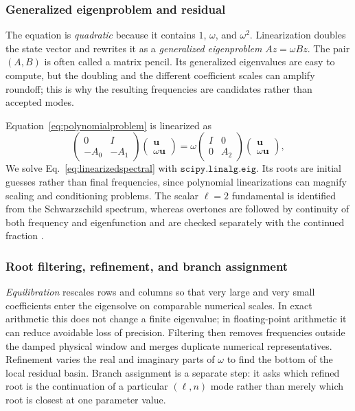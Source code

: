 \documentclass[12pt,a4paper]{article}
\begin{document}
\subsubsection{Generalized eigenproblem and residual}

The equation is \emph{quadratic} because it contains \(1\), \(\omega\), and
\(\omega^2\).  Linearization doubles the state vector and rewrites it as a
\emph{generalized eigenproblem} \(Az=\omega Bz\).  The pair \((A,B)\) is often
called a matrix pencil.  Its generalized eigenvalues are easy to compute, but
the doubling and the different coefficient scales can amplify roundoff; this
is why the resulting frequencies are candidates rather than accepted modes.

Equation~\eqref{eq:polynomialproblem} is linearized as
\begin{equation}
\begin{pmatrix}
0&I\\
-A_0&-A_1
\end{pmatrix}
\begin{pmatrix}
\bm{u}\\
\omega\bm{u}
\end{pmatrix}
=
\omega
\begin{pmatrix}
I&0\\
0&A_2
\end{pmatrix}
\begin{pmatrix}
\bm{u}\\
\omega\bm{u}
\end{pmatrix},
\label{eq:linearizedspectral}
\end{equation}
We solve Eq.~\eqref{eq:linearizedspectral} with
\(\texttt{scipy.linalg.eig}\). Its roots are initial guesses rather than final
frequencies, since polynomial linearizations can magnify scaling and
conditioning problems. The scalar \(\ell=2\) fundamental is identified from
the Schwarzschild spectrum, whereas overtones are followed by continuity of
both frequency and eigenfunction and are checked separately with the
continued fraction \cite{Leaver1985,Jansen2017}.

\subsubsection{Root filtering, refinement, and branch assignment}

\emph{Equilibration} rescales rows and columns so that very large and very
small coefficients enter the eigensolve on comparable numerical scales.  In
exact arithmetic this does not change a finite eigenvalue; in floating-point
arithmetic it can reduce avoidable loss of precision.  Filtering then removes
frequencies outside the damped physical window and merges duplicate numerical
representatives.  Refinement varies the real and imaginary parts of \(\omega\)
to find the bottom of the local residual basin.  Branch assignment is a
separate step: it asks which refined root is the continuation of a particular
\((\ell,n)\) mode rather than merely which root is closest at one parameter
value.
\end{document}
